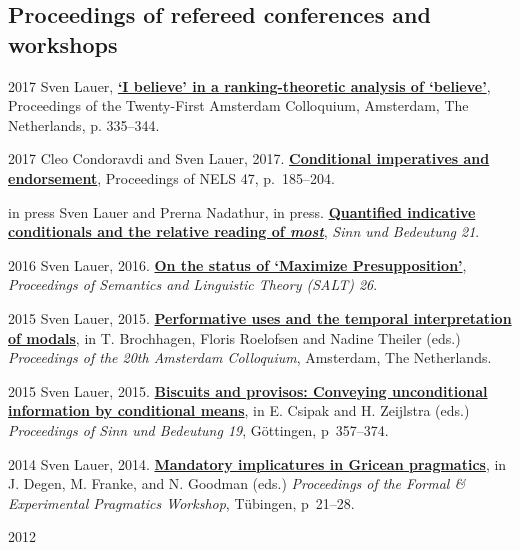 \subsection*{Proceedings of refereed conferences and workshops}
\begin{dated}
	\item[2017]
		Sven Lauer, 
		\href{http://sven-lauer.net/output/Lauer-AC17-I-Believe.pdf}{\textbf{`I believe' in a ranking-theoretic analysis of `believe'}},
		Proceedings of the Twenty-First Amsterdam Colloquium, 
		Amsterdam, The Netherlands, p. 335--344.
	\item[2017]
		Cleo Condoravdi and Sven Lauer, 2017. 
		\href{http://sven-lauer.net/output/CondoravdiLauer-NELS47-conditional-imperatives.pdf}{\textbf{Conditional imperatives and endorsement}}, 
		Proceedings of NELS 47, p.~185--204.
	\item[in press]
		Sven Lauer and Prerna Nadathur, in press.
		\href{http://sven-lauer.net/output/LauerNadathur-SuB21-most.pdf}{\textbf{Quantified indicative conditionals and the relative reading of {\it most}}}, 
		\textit{Sinn und Bedeutung 21}.
	\item[2016]
		Sven Lauer, 2016.
		\href{http://journals.linguisticsociety.org/proceedings/index.php/SALT/article/view/26.980/3695}{\textbf{On the status of `Maximize Presupposition'}}, 
		\textit{Proceedings of Semantics and Linguistic Theory (SALT) 26}.
	\item[2015]
		Sven Lauer, 2015. 
		\href{http://sven-lauer.net/output/Lauer-AC15-performative-modals.pdf}{\textbf{Performative uses and the temporal interpretation of modals}}, 
		in T. Brochhagen, Floris Roelofsen and Nadine Theiler (eds.) 
		\textit{Proceedings of the 20th Amsterdam Colloquium}, 
		Amsterdam, The Netherlands.
	\item[2015]
		Sven Lauer, 2015.
		\href{http://sven-lauer.net/output/Lauer-SuB19-BiscuitsProvisos.pdf}{\textbf{Biscuits and provisos: Conveying unconditional information by conditional means}}, 
		in E. Csipak and H. Zeijlstra (eds.) 
		\textit{Proceedings of Sinn und Bedeutung 19}, G\"ottingen,
		p~357--374.
	\item[2014]
		Sven Lauer, 2014. 
		\href{https://sites.google.com/site/fepesslli2014/proceedings}{\textbf{Mandatory implicatures in Gricean pragmatics}}, 
		in J. Degen, M. Franke, and N. Goodman (eds.)
		\textit{Proceedings of the Formal \& Experimental Pragmatics Workshop}, T\"ubingen,
		p~21--28.
	\item[2012]

\end{dated}
